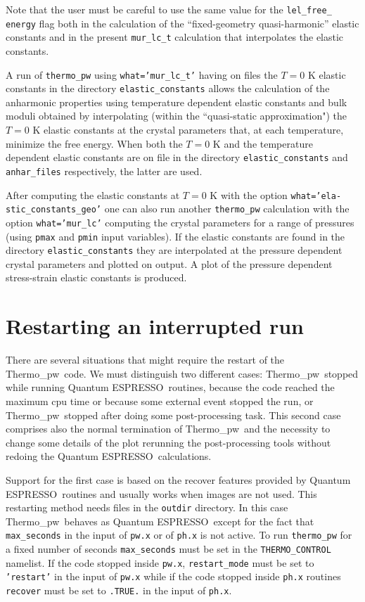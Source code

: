 \documentclass[12pt,a4paper,twoside]{report}
\def\qe{{\sc Quantum ESPRESSO}}
\def\thermo{{\sc Thermo}\_{\sc pw}}
\begin{document}
Note that the user must be careful to use the same value for the
\texttt{lel\_free\_} \texttt{energy} flag both in the calculation of the 
``fixed-geometry quasi-harmonic'' elastic
constants and in the present \texttt{mur\_lc\_t} calculation that 
interpolates the elastic constants.

A run of \texttt{thermo\_pw} using 
\texttt{what='mur\_lc\_t'} having on files the $T=0$ K elastic constants
in the directory \texttt{elastic\_constants}
allows the calculation of the anharmonic properties using temperature
dependent elastic constants and bulk moduli obtained by interpolating 
(within the ``quasi-static approximation") the $T=0$ K elastic constants 
at the crystal parameters that, at each temperature, 
minimize the free energy. 
When both the $T=0$ K and the temperature dependent elastic constants
are on file in the directory \texttt{elastic\_constants} and 
\texttt{anhar\_files} respectively, the latter are used.

After computing the elastic constants at $T=0$ K with the option
\texttt{what='ela-} \texttt{stic\_constants\_geo'}
one can also run another \texttt{thermo\_pw} calculation with the option
\texttt{what='mur\_lc'} computing the crystal parameters for a range
of pressures (using \texttt{pmax} and \texttt{pmin} input variables). If
the elastic constants are found in the directory \texttt{elastic\_constants} 
they are interpolated at the pressure dependent crystal parameters and
plotted on output. A plot of the pressure dependent stress-strain elastic
constants is produced.

\newpage
{\color{dark-blue}\chapter{Restarting an interrupted run}}
\color{black}

There are several situations that might require the restart of the \thermo\ 
code. We must distinguish two different cases:
\thermo\ stopped while running \qe\ routines, because the code reached
the maximum cpu time or because some external event stopped the run,
or \thermo\ stopped after doing some post-processing task. This second 
case comprises also the normal termination of
\thermo\ and the necessity to change some details of the plot rerunning
the post-processing tools without redoing the \qe\ calculations.

Support for the first case is based on the recover features provided by 
\qe\ routines and usually works when images are not used. This restarting 
method needs files in the \texttt{outdir}
directory. In this case \thermo\ behaves as \qe\ 
except for the fact that \texttt{max\_seconds} in the input of \texttt{pw.x} or
of \texttt{ph.x} is not active. To run \texttt{thermo\_pw}
for a fixed number of seconds \texttt{max\_seconds} must be set in the
\texttt{THERMO\_CONTROL} namelist. If the code stopped inside \texttt{pw.x},
\texttt{restart\_mode} must be set to \texttt{'restart'} in the input of 
\texttt{pw.x} while if the code stopped inside \texttt{ph.x} routines
\texttt{recover} must be set to \texttt{.TRUE.} in the input of \texttt{ph.x}.
\end{document}
